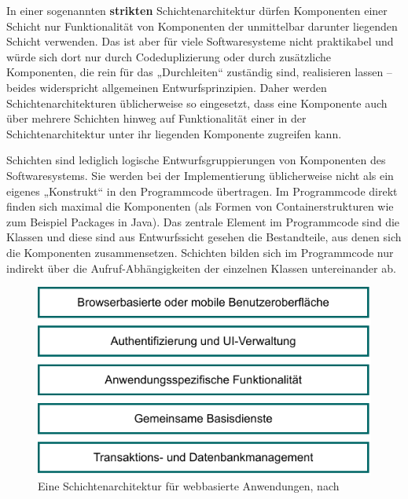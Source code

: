 In einer sogenannten \textbf{strikten} Schichtenarchitektur dürfen Komponenten einer 
\linebreak %
Schicht nur Funktionalität von Komponenten der unmittelbar darunter liegenden Schicht verwenden. Das ist aber für viele Softwaresysteme nicht praktikabel und würde sich dort nur durch Codeduplizierung oder durch zusätzliche Komponenten, die rein für das „Durchleiten“ zuständig sind, realisieren lassen – beides widerspricht allgemeinen Entwurfsprinzipien. Daher werden Schichtenarchitekturen üblicherweise so eingesetzt, dass eine Komponente auch über mehrere Schichten hinweg auf Funktionalität einer in der Schichtenarchitektur unter ihr liegenden Komponente zugreifen kann.

Schichten sind lediglich logische Entwurfsgruppierungen von Komponenten des Softwaresystems. Sie werden bei der Implementierung üblicherweise nicht als ein eigenes „Konstrukt“ in den Programmcode übertragen. Im Programmcode direkt finden sich maximal die Komponenten (als Formen von Containerstrukturen wie zum Beispiel Packages in Java). Das zentrale Element im Programmcode sind die Klassen und diese sind aus Entwurfssicht gesehen die Bestandteile, aus denen sich die Komponenten zusammensetzen. Schichten bilden sich im Programmcode nur indirekt über die Aufruf-Abhängigkeiten der einzelnen Klassen untereinander ab.  

\begin{figure}[h!]
	\centering
	\includegraphics{Bilder/Kapitel-7/schichtenarchitektur_fuer_webbasierte_anwendungen.pdf}
	\caption[Eine Schichtenarchitektur für webbasierte Anwendungen]{Eine Schichtenarchitektur für webbasierte Anwendungen, nach \cite[108]{som20}}
	\label{fig:schichtenarchitektur_fuer_webbasierte_anwendungen}
\end{figure}

